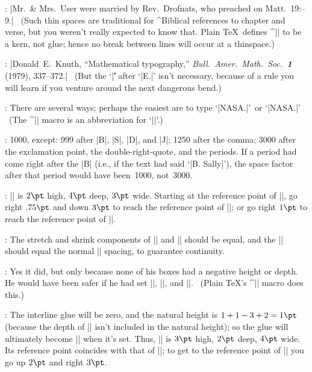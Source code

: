{{{:
 |Mr.~\& Mrs.~User
were married by Rev.~Drofnats, who preached on
Matt.~19\thinspace:--9.| \ (Such thin spaces are traditional
for ^{Biblical references} to chapter and verse, but you weren't really
expected to know that. Plain \TeX\ defines ^|\thinspace| to be a kern,
not glue; hence no break between lines will occur at a thinspace.)

:
 |Donald~E.\ Knuth, ``Mathematical typography,'' {\sl Bull.\
Amer.\ Math.\ Soc.\ \bf1} (1979), 337--372.| \ (But the `|\|' after `|E.|'
isn't necessary, because of a rule you will learn if you venture
around the next dangerous bend.)

:
 There are several ways; perhaps the easiest are to type
`|\hbox{NASA}.|'\ or `|NASA\null.|' \ (The ^|\null| macro is an abbreviation
for `|\hbox{}|'.)

:
 1000, except: 999 after |B|, |S|, |D|, and |J|; 1250 after the
comma; 3000 after the exclamation point, the double-right-quote, and the
periods. If a period had come right after the |B| (i.e., if the text had
said `|B. Sally|'), the space factor after that period would have
been~1000, not~3000.

:
 || is $2\pt$ high, $4\pt$ deep, $3\pt$ wide.
Starting at the reference point of\/ |\box3|, go right $.75\pt$ and down
$3\pt$ to reach the reference point of\/ |\box1|; or go right $1\pt$
to reach the reference point of\/ |\box2|.

:
 The stretch and shrink components of\/ |\baselineskip| and
|\lineskip| should be equal, and the |\lineskiplimit| should
equal the normal |\lineskip| spacing, to guarantee continuity.

:
 Yes it did, but only because none of his boxes had a negative
height or depth. He would have been safer if he had set
|\baselineskip=-1000pt|, |\lineskip=0pt|, and
|\lineskiplimit=16383pt|. \ (Plain \TeX's ^|\offinterlineskip| macro does this.)

:
 The interline glue will be zero, and the natural height is
$1+1-3+2=1\pt$ (because the depth of\/ || isn't included in the natural
height); so the glue will ultimately become |\vskip-1pt| when it's set.
Thus, |\box3| is $3\pt$ high, $2\pt$ deep, $4\pt$ wide. Its reference
point coincides with that of\/ |\box2|; to get to the reference point
of\/ |\box1| you go up $2\pt$ and right $3\pt$.

}}}
